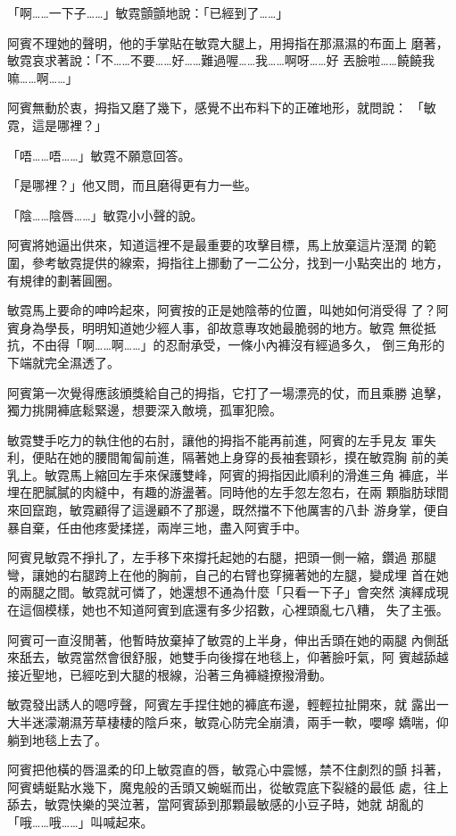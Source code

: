 「啊……一下子……」敏霓顫顫地說：「已經到了……」

阿賓不理她的聲明，他的手掌貼在敏霓大腿上，用拇指在那濕濕的布面上
磨著，敏霓哀求著說：「不……不要……好……難過喔……我……啊呀……好
丟臉啦……饒饒我嘛……啊……」

阿賓無動於衷，拇指又磨了幾下，感覺不出布料下的正確地形，就問說：
「敏霓，這是哪裡？」

「唔……唔……」敏霓不願意回答。

「是哪裡？」他又問，而且磨得更有力一些。

「陰……陰唇……」敏霓小小聲的說。

阿賓將她逼出供來，知道這裡不是最重要的攻擊目標，馬上放棄這片溼潤
的範圍，參考敏霓提供的線索，拇指往上挪動了一二公分，找到一小點突出的
地方，有規律的劃著圓圈。

敏霓馬上要命的呻吟起來，阿賓按的正是她陰蒂的位置，叫她如何消受得
了？阿賓身為學長，明明知道她少經人事，卻故意專攻她最脆弱的地方。敏霓
無從抵抗，不由得「啊……啊……」的忍耐承受，一條小內褲沒有經過多久，
倒三角形的下端就完全濕透了。

阿賓第一次覺得應該頒獎給自己的拇指，它打了一場漂亮的仗，而且乘勝
追擊，獨力挑開褲底鬆緊邊，想要深入敵境，孤軍犯險。

敏霓雙手吃力的執住他的右肘，讓他的拇指不能再前進，阿賓的左手見友
軍失利，便貼在她的腰間匍匐前進，隔著她上身穿的長袖套頸衫，摸在敏霓胸
前的美乳上。敏霓馬上縮回左手來保護雙峰，阿賓的拇指因此順利的滑進三角
褲底，半埋在肥膩膩的肉縫中，有趣的游盪著。同時他的左手忽左忽右，在兩
顆脂肪球間來回竄跑，敏霓顧得了這邊顧不了那邊，既然擋不下他厲害的八卦
游身掌，便自暴自棄，任由他疼愛揉搓，兩岸三地，盡入阿賓手中。

阿賓見敏霓不掙扎了，左手移下來撐托起她的右腿，把頭一側一縮，鑽過
那腿彎，讓她的右腿跨上在他的胸前，自己的右臂也穿擁著她的左腿，變成埋
首在她的兩腿之間。敏霓就可憐了，她還想不通為什麼「只看一下子」會突然
演繹成現在這個模樣，她也不知道阿賓到底還有多少招數，心裡頭亂七八糟，
失了主張。

阿賓可一直沒閒著，他暫時放棄掉了敏霓的上半身，伸出舌頭在她的兩腿
內側舐來舐去，敏霓當然會很舒服，她雙手向後撐在地毯上，仰著臉吁氣，阿
賓越舔越接近聖地，已經吃到大腿的根線，沿著三角褲縫撩撥滑動。

敏霓發出誘人的嗯哼聲，阿賓左手捏住她的褲底布邊，輕輕拉扯開來，就
露出一大半迷濛潮濕芳草棲棲的陰戶來，敏霓心防完全崩潰，兩手一軟，嚶嚀
嬌喘，仰躺到地毯上去了。

阿賓把他橫的唇溫柔的印上敏霓直的唇，敏霓心中震憾，禁不住劇烈的顫
抖著，阿賓蜻蜓點水幾下，魔鬼般的舌頭又蜿蜒而出，從敏霓底下裂縫的最低
處，往上舔去，敏霓快樂的哭泣著，當阿賓舔到那顆最敏感的小豆子時，她就
胡亂的「哦……哦……」叫喊起來。

